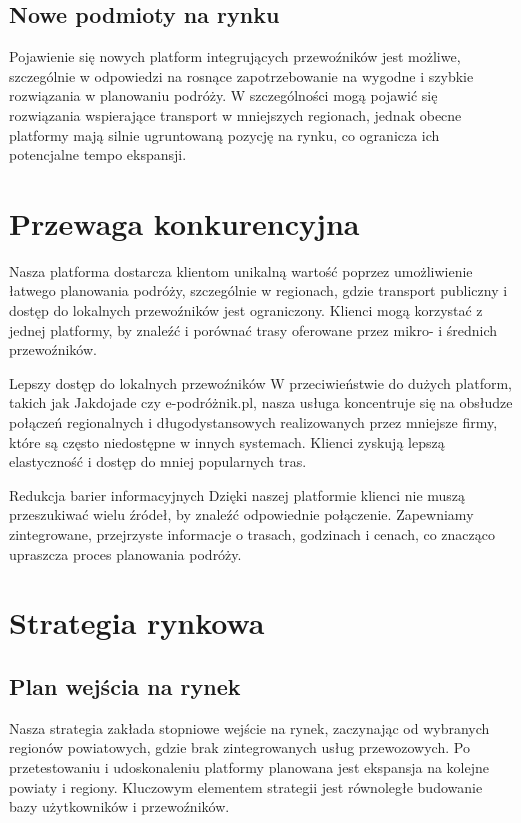     \subsection{Nowe podmioty na rynku}
    Pojawienie się nowych platform integrujących przewoźników jest możliwe, szczególnie w odpowiedzi na rosnące zapotrzebowanie na wygodne i szybkie rozwiązania w planowaniu podróży. W szczególności mogą pojawić się rozwiązania wspierające transport w mniejszych regionach, jednak obecne platformy mają silnie ugruntowaną pozycję na rynku, co ogranicza ich potencjalne tempo ekspansji.

    \section{Przewaga konkurencyjna}

    Nasza platforma dostarcza klientom unikalną wartość poprzez umożliwienie łatwego planowania podróży, szczególnie w regionach, gdzie transport publiczny i dostęp do lokalnych przewoźników jest ograniczony. Klienci mogą korzystać z jednej platformy, by znaleźć i porównać trasy oferowane przez mikro- i średnich przewoźników.

    Lepszy dostęp do lokalnych przewoźników
    W przeciwieństwie do dużych platform, takich jak Jakdojade czy e-podróżnik.pl, nasza usługa koncentruje się na obsłudze połączeń regionalnych i długodystansowych realizowanych przez mniejsze firmy, które są często niedostępne w innych systemach. Klienci zyskują lepszą elastyczność i dostęp do mniej popularnych tras.

    Redukcja barier informacyjnych
    Dzięki naszej platformie klienci nie muszą przeszukiwać wielu źródeł, by znaleźć odpowiednie połączenie. Zapewniamy zintegrowane, przejrzyste informacje o trasach, godzinach i cenach, co znacząco upraszcza proces planowania podróży.

\section{Strategia rynkowa}

    \subsection{Plan wejścia na rynek}
    Nasza strategia zakłada stopniowe wejście na rynek, zaczynając od wybranych regionów powiatowych, gdzie brak zintegrowanych usług przewozowych. Po przetestowaniu i udoskonaleniu platformy planowana jest ekspansja na kolejne powiaty i regiony. Kluczowym elementem strategii jest równoległe budowanie bazy użytkowników i przewoźników.

